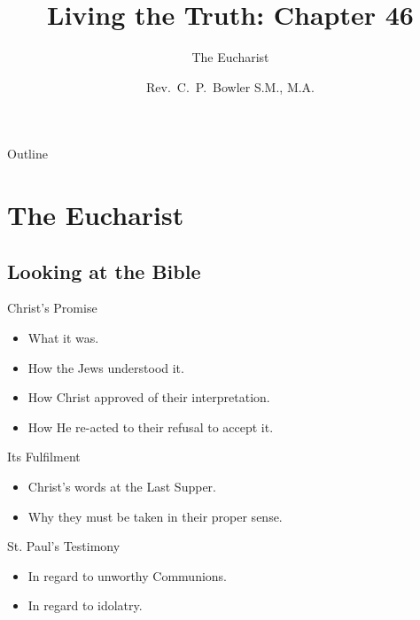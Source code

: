 \documentclass{beamer}
\title[Living the Truth 46] %
{Living the Truth: Chapter 46}
\subtitle
{The Eucharist} %
\author{Rev.~C.~P.~Bowler S.M., M.A.}
\begin{document}
\begin{frame}
  \titlepage
\end{frame}

\begin{frame}{Outline}
  \tableofcontents
\end{frame}




\section{The Eucharist}

\subsection{Looking at the Bible}

\begin{frame}{Christ's Promise}
\begin{itemize}
\item What it was.
\item How the Jews understood it.
\item How Christ approved of their interpretation.
\item How He re-acted to their refusal to accept it.
\end{itemize}
\end{frame}

\begin{frame}{Its Fulfilment}
\begin{itemize}
\item Christ's words at the Last Supper.
\item Why they must be taken in their proper sense.
\end{itemize}
\end{frame}

\begin{frame}{St. Paul's Testimony}
\begin{itemize}
\item In regard to unworthy Communions.
\item In regard to idolatry.
\end{itemize}
\end{frame}
\end{document}
